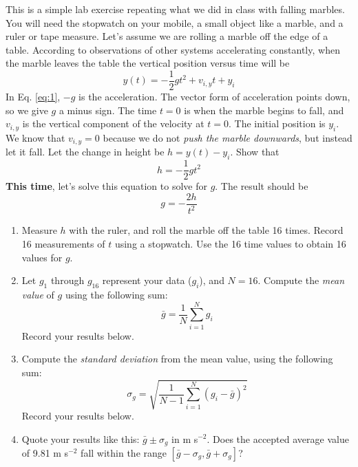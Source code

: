 \documentclass{article}
\begin{document}
This is a simple lab exercise repeating what we did in class with falling marbles.  You will need the stopwatch on your mobile, a small object like a marble, and a ruler or tape measure.  Let's assume we are rolling a marble off the edge of a table.  According to observations of other systems accelerating constantly, when the marble leaves the table the vertical position versus time will be 
\begin{equation}
y(t) = -\frac{1}{2}gt^2 + v_{i,y} t + y_i \label{eq:1}
\end{equation}
In Eq. \ref{eq:1}, $-g$ is the acceleration.  The vector form of acceleration points down, so we give $g$ a minus sign.  The time $t=0$ is when the marble begins to fall, and $v_{i,y}$ is the vertical component of the velocity at $t=0$.  The initial position is $y_i$.  We know that $v_{i,y} = 0$ because we do not \textit{push the marble downwards}, but instead let it fall.  Let the change in height be $h = y(t) - y_i$.  Show that
\begin{equation}
h = -\frac{1}{2}g t^2
\end{equation}
\textbf{This time}, let's solve this equation to solve for $g$.  The result should be
\begin{equation}
g = -\frac{2 h}{t^2}
\end{equation}
\begin{enumerate}
\item Measure $h$ with the ruler, and roll the marble off the table 16 times.  Record 16 measurements of $t$ using a stopwatch.  Use the 16 time values to obtain 16 values for $g$.
\item Let $g_1$ through $g_{16}$ represent your data ($g_i$), and $N = 16$.  Compute the \textit{mean value} of $g$ using the following sum:
\begin{equation}
\bar{g} = \frac{1}{N} \sum_{i=1}^{N} g_i
\end{equation}
Record your results below.
\item Compute the \textit{standard deviation} from the mean value, using the following sum:
\begin{equation}
\sigma_g = \sqrt{\frac{1}{N-1}\sum_{i=1}^{N} (g_i - \bar{g})^2}
\end{equation}
Record your results below.
\item Quote your results like this: $\bar{g} \pm \sigma_g$ in m s$^{-2}$.  Does the accepted average value of 9.81 m s$^{-2}$ fall within the range $[\bar{g} - \sigma_g, \bar{g} + \sigma_g]$?
\end{enumerate}
\end{document}
